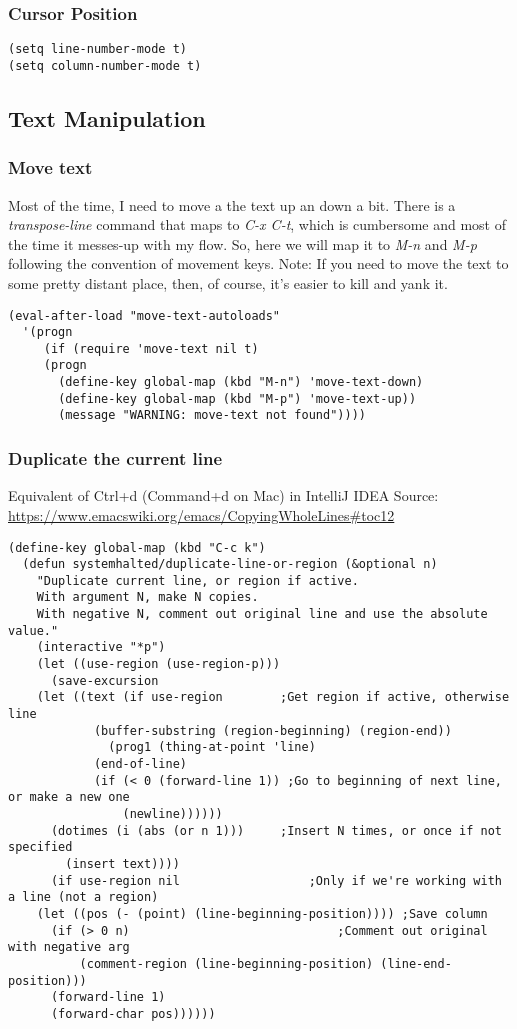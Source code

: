 \documentclass[11pt]{article}
\begin{document}
\subsubsection{Cursor Position}
\label{sec:orgf56b15a}
\begin{verbatim}
(setq line-number-mode t)
(setq column-number-mode t)
\end{verbatim}
\subsection{Text Manipulation}
\label{sec:org103a5c2}
\subsubsection{Move text}
\label{sec:org3093d7e}
Most of the time, I need to move a the text up an down a bit. There is a \emph{transpose-line} command that maps to \emph{C-x C-t}, which is cumbersome and most of the time it messes-up with my flow. So, here we will map it to \emph{M-n} and \emph{M-p} following the convention of movement keys. 
Note: If you need to move the text to some pretty distant place, then, of course, it’s easier to kill and yank it.

\begin{verbatim}
(eval-after-load "move-text-autoloads"
  '(progn
     (if (require 'move-text nil t)
	 (progn
	   (define-key global-map (kbd "M-n") 'move-text-down)
	   (define-key global-map (kbd "M-p") 'move-text-up))
       (message "WARNING: move-text not found"))))
\end{verbatim}

\subsubsection{Duplicate the current line}
\label{sec:org607d37a}
Equivalent of Ctrl+d (Command+d on Mac) in IntelliJ IDEA
Source: \url{https://www.emacswiki.org/emacs/CopyingWholeLines\#toc12}

\begin{verbatim}
(define-key global-map (kbd "C-c k")
  (defun systemhalted/duplicate-line-or-region (&optional n)
    "Duplicate current line, or region if active.
    With argument N, make N copies.
    With negative N, comment out original line and use the absolute value."
    (interactive "*p")
    (let ((use-region (use-region-p)))
      (save-excursion
	(let ((text (if use-region        ;Get region if active, otherwise line
			(buffer-substring (region-beginning) (region-end))
		      (prog1 (thing-at-point 'line)
			(end-of-line)
			(if (< 0 (forward-line 1)) ;Go to beginning of next line, or make a new one
			    (newline))))))
	  (dotimes (i (abs (or n 1)))     ;Insert N times, or once if not specified
	    (insert text))))
      (if use-region nil                  ;Only if we're working with a line (not a region)
	(let ((pos (- (point) (line-beginning-position)))) ;Save column
	  (if (> 0 n)                             ;Comment out original with negative arg
	      (comment-region (line-beginning-position) (line-end-position)))
	  (forward-line 1)
	  (forward-char pos))))))
\end{verbatim}
\end{document}
